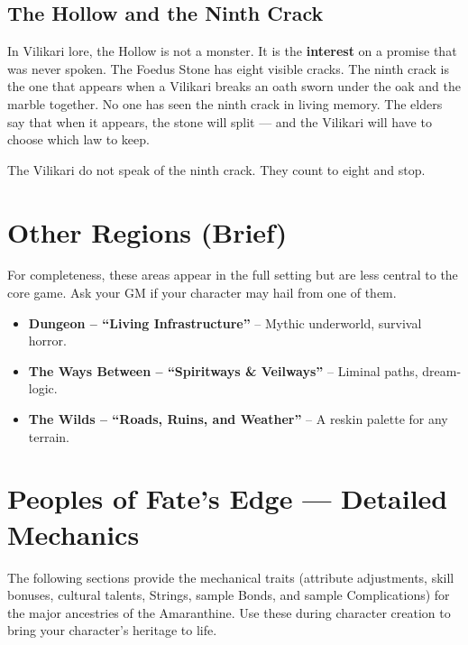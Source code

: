 \subsection*{The Hollow and the Ninth Crack}

In Vilikari lore, the Hollow is not a monster. It is the \textbf{interest} on a promise that was never spoken. The Foedus Stone has eight visible cracks. The ninth crack is the one that appears when a Vilikari breaks an oath sworn under the oak and the marble together. No one has seen the ninth crack in living memory. The elders say that when it appears, the stone will split --- and the Vilikari will have to choose which law to keep.

The Vilikari do not speak of the ninth crack. They count to eight and stop.

\clearpage
\section{Other Regions (Brief)}
\label{sec:cultures-other}
For completeness, these areas appear in the full setting but are less central to the core game. Ask your GM if your character may hail from one of them.
\begin{itemize}
  \item \textbf{Dungeon -- ``Living Infrastructure''} -- Mythic underworld, survival horror.
  \item \textbf{The Ways Between -- ``Spiritways \& Veilways''} -- Liminal paths, dream-logic.
  \item \textbf{The Wilds -- ``Roads, Ruins, and Weather''} -- A reskin palette for any terrain.
\end{itemize}

\section{Peoples of Fate's Edge --- Detailed Mechanics}
\label{sec:peoples-mechanics}

The following sections provide the mechanical traits (attribute adjustments, skill bonuses, cultural talents, Strings, sample Bonds, and sample Complications) for the major ancestries of the Amaranthine. Use these during character creation to bring your character's heritage to life.

